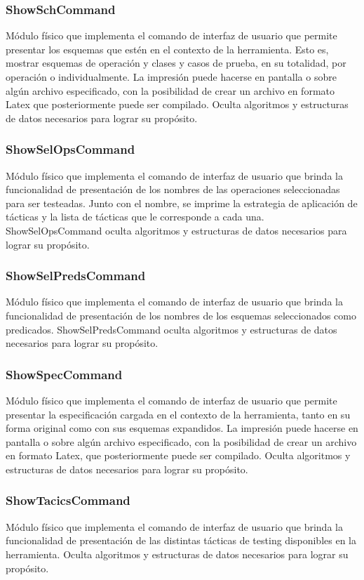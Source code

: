 \documentclass[a4paper,10pt]{report}
\begin{document}
			\subsubsection{ShowSchCommand}
			Módulo físico que implementa el comando de interfaz de usuario que permite presentar los esquemas que estén en el contexto de la herramienta. Esto es, mostrar esquemas de operación y clases y casos de prueba, en su totalidad, por operación o individualmente. La impresión puede hacerse en pantalla o sobre algún archivo especificado, con la posibilidad de crear un archivo en formato Latex que posteriormente puede ser compilado. Oculta algoritmos y estructuras de datos necesarios para lograr su propósito.
			\subsubsection{ShowSelOpsCommand}
			Módulo físico que implementa el comando de interfaz de usuario que brinda la funcionalidad de presentación de los nombres de las operaciones seleccionadas para ser testeadas. Junto con el nombre, se imprime la estrategia de aplicación de tácticas y la lista de tácticas que le corresponde a cada una. ShowSelOpsCommand oculta algoritmos y estructuras de datos necesarios para lograr su propósito.
			\subsubsection{ShowSelPredsCommand}
			Módulo físico que implementa el comando de interfaz de usuario que brinda la funcionalidad de presentación de los nombres de los esquemas seleccionados como predicados. ShowSelPredsCommand oculta algoritmos y estructuras de datos necesarios para lograr su propósito.			
			\subsubsection{ShowSpecCommand}
			Módulo físico que implementa el comando de interfaz de usuario que permite presentar la especificación cargada en el contexto de la herramienta, tanto en su forma original como con sus esquemas expandidos. La impresión puede hacerse en pantalla o sobre algún archivo especificado, con la posibilidad de crear un archivo en formato Latex, que posteriormente puede ser compilado. Oculta algoritmos y estructuras de datos necesarios para lograr su propósito.
			\subsubsection{ShowTacicsCommand}
			Módulo físico que implementa el comando de interfaz de usuario que brinda la funcionalidad de presentación de las distintas tácticas de testing disponibles en la herramienta. Oculta algoritmos y estructuras de datos necesarios para lograr su propósito.
\end{document}
